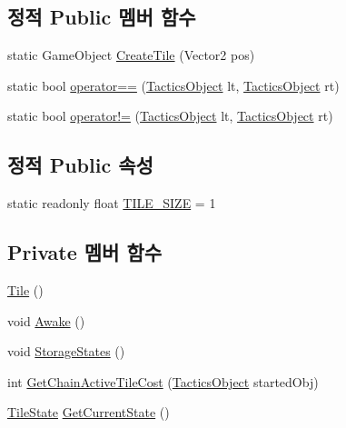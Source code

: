 \subsection*{정적 Public 멤버 함수}
\begin{DoxyCompactItemize}
\item 
static Game\+Object \hyperlink{class_tile_aec3cdb55a67f4c12d3056355c15bdba2}{Create\+Tile} (Vector2 pos)
\item 
static bool \hyperlink{class_tactics_object_a18f2979a4bf81dc755fbc17e425809f0}{operator==} (\hyperlink{class_tactics_object}{Tactics\+Object} lt, \hyperlink{class_tactics_object}{Tactics\+Object} rt)
\item 
static bool \hyperlink{class_tactics_object_a49e235618a22126faa6271243cd89710}{operator!=} (\hyperlink{class_tactics_object}{Tactics\+Object} lt, \hyperlink{class_tactics_object}{Tactics\+Object} rt)
\end{DoxyCompactItemize}
\subsection*{정적 Public 속성}
\begin{DoxyCompactItemize}
\item 
static readonly float \hyperlink{class_tile_a51b7dea4344573ba12a461a32517e683}{T\+I\+L\+E\+\_\+\+S\+I\+ZE} = 1
\end{DoxyCompactItemize}
\subsection*{Private 멤버 함수}
\begin{DoxyCompactItemize}
\item 
\hyperlink{class_tile_a7684d2e86beeb06d844ebb7819b11b33}{Tile} ()
\item 
void \hyperlink{class_tile_a4fbf82b2a26cdeb792dc78192d7247dc}{Awake} ()
\item 
void \hyperlink{class_tile_a6cb69a9fad04bee1fa3473aec22428de}{Storage\+States} ()
\item 
int \hyperlink{class_tile_a81b4dd833bdeade289583aabbdcaff73}{Get\+Chain\+Active\+Tile\+Cost} (\hyperlink{class_tactics_object}{Tactics\+Object} started\+Obj)
\item 
\hyperlink{class_tile_1_1_tile_state}{Tile\+State} \hyperlink{class_tile_ae37e08e39263e766fdc612de94fb7a0d}{Get\+Current\+State} ()
\end{DoxyCompactItemize}
